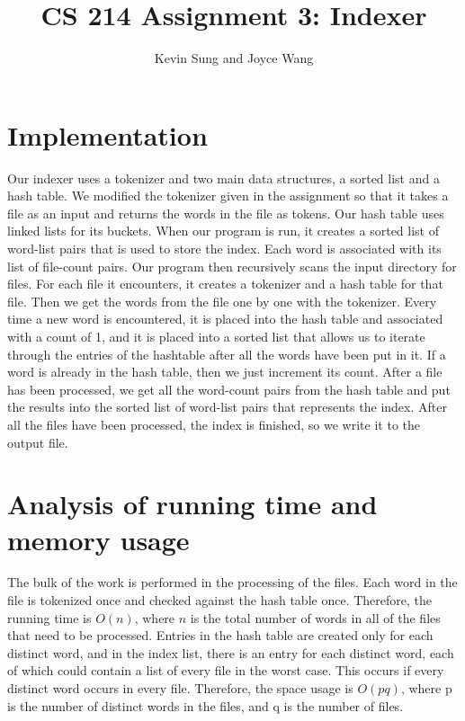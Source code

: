 \documentclass{article}
\title{CS 214 Assignment 3: Indexer}
\author{Kevin Sung and Joyce Wang}
\begin{document}
\maketitle

\section{Implementation}

Our indexer uses a tokenizer and two main data structures, a sorted list and a hash table. We modified the tokenizer
given in the assignment so that it takes a file as an input and returns the words in the file as tokens. Our hash
table uses linked lists for its buckets.
When our program is run, it creates a sorted list of word-list pairs that is used to store the index. Each word is
associated with its list of file-count pairs. Our program then recursively scans the input directory for files.
For each file it encounters, it creates
a tokenizer and a hash table for that file. Then we get the words from the file one by one with the tokenizer. Every
time a new word is encountered, it is placed into the hash table and associated with a count of 1, and it is placed
into a sorted list that allows us to iterate through the entries of the hashtable after all the words have been put
in it. If a word is already in the hash table, then we just increment its count. After a file has been processed, we
get all the word-count pairs from the hash table and put the results into the sorted list of word-list pairs that
represents the index. After all the files have been processed, the index is finished, so we write it to the output
file.

\section{Analysis of running time and memory usage}

The bulk of the work is performed in the processing of the files. Each word in the file is tokenized once and checked
against the hash table once. Therefore, the running time is $O(n)$, where $n$ is the total number of words in all
of the files that need to be processed. Entries in the hash table are created only for each distinct word, and
in the index list, there is an entry for each distinct word, each of which could contain a list of every file in
the worst case. This occurs if every distinct word occurs in every file. Therefore, the space usage is $O(pq)$,
where p is the number of distinct words in the files, and q is the number of files.
\end{document}
